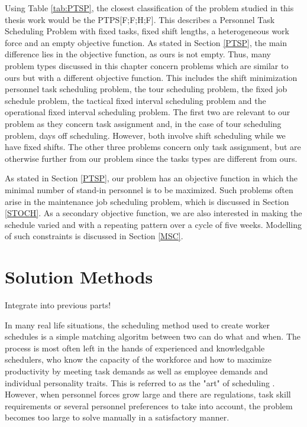 Using Table \ref{tab:PTSP}, the closest classification of the problem studied in this thesis work would be the PTPS[F;F;H;F]. This describes a Personnel Task Scheduling Problem with fixed tasks, fixed shift lengths, a heterogeneous work force and an empty objective function. As stated in Section \ref{PTSP}, the main difference lies in the objective function, as ours is not empty. Thus, many problem types discussed in this chapter concern problems which are similar to ours but with a different objective function. This includes the shift minimization personnel task scheduling problem, the tour scheduling problem, the fixed job schedule problem, the tactical fixed interval scheduling problem and the operational fixed interval scheduling problem. The first two are relevant to our problem as they concern task assignment and, in the case of tour scheduling problem, days off scheduling. However, both involve shift scheduling while we have fixed shifts. The other three problems concern only task assignment, but are otherwise further from our problem since the tasks types are different from ours.

As stated in Section \ref{PTSP}, our problem has an objective function in which the minimal number of stand-in personnel is to be maximized. Such problems often arise in the maintenance job scheduling problem, which is discussed in Section \ref{STOCH}. As a secondary objective function, we are also interested in making the schedule varied and with a repeating pattern over a cycle of five weeks. Modelling of such constraints is discussed in Section \ref{MSC}.











\iffalse


\section{Solution Methods}
Integrate into previous parts!


In many real life situations, the scheduling method used to create worker schedules is a simple matching algoritm between two can do what and when. The process is most often left in the hands of experienced and knowledgable schedulers, who know the capacity of the workforce and how to maximize productivity by meeting task demands as well as employee demands and individual personality traits. This is referred to as the "art" of scheduling \citet{roberts_1983}. However, when personnel forces grow large and there are regulations, task skill requirements or several personnel preferences to take into account, the problem becomes too large to solve manually in a satisfactory manner.

